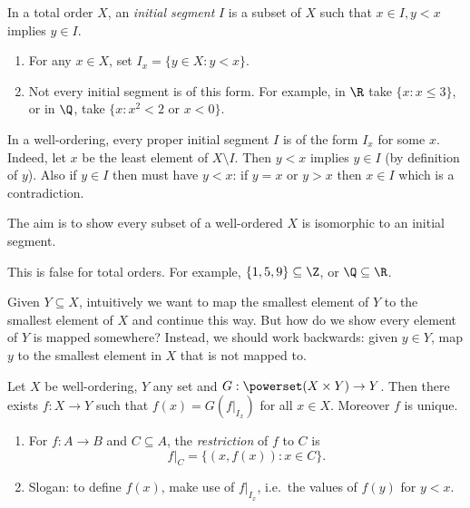 \documentclass[a4paper]{article}
\begin{document}
\begin{definition}
  In a total order \(X\), an \emph{initial segment} \(I\) is a subset of \(X\) such that \(x \in I, y < x\) implies \(y \in I\).
\end{definition}

\begin{eg}\leavevmode
  \begin{enumerate}
  \item For any \(x \in X\), set \(I_x = \{y \in X: y < x\}\).
  \item Not every initial segment is of this form. For example, in \(\R\) take \(\{x: x \leq 3\}\), or in \(\Q\), take \(\{x: x^2 < 2 \text{ or } x < 0\}\).
  \end{enumerate}
\end{eg}

\begin{note}
  In a well-ordering, every proper initial segment \(I\) is of the form \(I_x\) for some \(x\). Indeed, let \(x\) be the least element of \(X \setminus I\). Then \(y < x\) implies \(y \in I\) (by definition of \(y\)). Also if \(y \in I\) then must have \(y < x\): if \(y = x\) or \(y > x\) then \(x \in I\) which is a contradiction.
\end{note}

The aim is to show every subset of a well-ordered \(X\) is isomorphic to an initial segment.

\begin{note}
  This is false for total orders. For example, \(\{1, 5, 9\} \subseteq \Z\), or \(\Q \subseteq \R\).
\end{note}

Given \(Y \subseteq X\), intuitively we want to map the smallest element of \(Y\) to the smallest element of \(X\) and continue this way. But how do we show every element of \(Y\) is mapped somewhere? Instead, we should work backwards: given  \(y \in Y\), map \(y\) to the smallest element in \(X\) that is not mapped to.

\begin{theorem}
  Let \(X\) be well-ordering, \(Y\) any set and \(G: \powerset(X \times Y) \to Y\). Then there exists \(f: X \to Y\) such that \(f(x) = G(f|_{I_x})\) for all \(x \in X\). Moreover \(f\) is unique.
\end{theorem}

\begin{note}\leavevmode
  \begin{enumerate}
  \item For \(f: A \to B\) and \(C \subseteq A\), the \emph{restriction} of \(f\) to \(C\) is
    \[
      f|_C = \{(x, f(x)): x \in C\}.
    \]
  \item Slogan: to define \(f(x)\), make use of \(f|_{I_x}\), i.e.\ the values of \(f(y)\) for \(y < x\).
  \end{enumerate}
\end{note}
\end{document}
